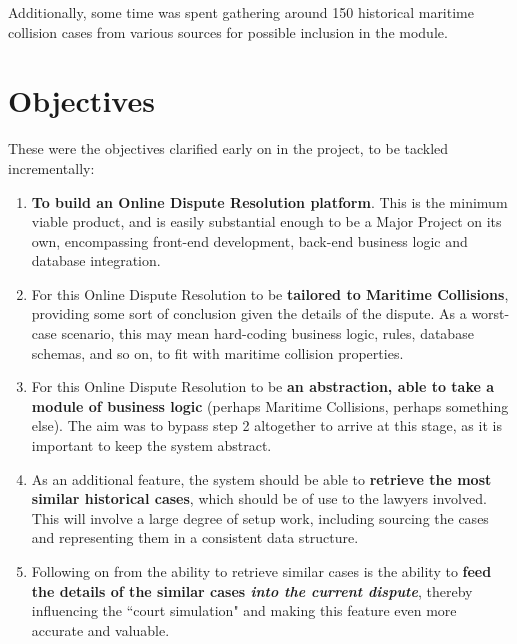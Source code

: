 Additionally, some time was spent gathering around 150 historical maritime collision cases from various sources for possible inclusion in the module. \cite{cases1}\cite{cases2}\cite{cases3}

\section{Objectives}

These were the objectives clarified early on in the project, to be tackled incrementally:

\begin{enumerate}

    \item \textbf{To build an Online Dispute Resolution platform}. This is the minimum viable product, and is easily substantial enough to be a Major Project on its own, encompassing front-end development, back-end business logic and database integration.
    
    \item For this Online Dispute Resolution to be \textbf{tailored to Maritime Collisions}, providing some sort of conclusion given the details of the dispute. As a worst-case scenario, this may mean hard-coding business logic, rules, database schemas, and so on, to fit with maritime collision properties.

    \item For this Online Dispute Resolution to be \textbf{an abstraction, able to take a module of business logic} (perhaps Maritime Collisions, perhaps something else). The aim was to bypass step 2 altogether to arrive at this stage, as it is important to keep the system abstract.

    \item As an additional feature, the system should be able to \textbf{retrieve the most similar historical cases}, which should be of use to the lawyers involved. This will involve a large degree of setup work, including sourcing the cases and representing them in a consistent data structure.

    \item Following on from the ability to retrieve similar cases is the ability to \textbf{feed the details of the similar cases \emph{into the current dispute}}, thereby influencing the ``court simulation" and making this feature even more accurate and valuable.

\end{enumerate}